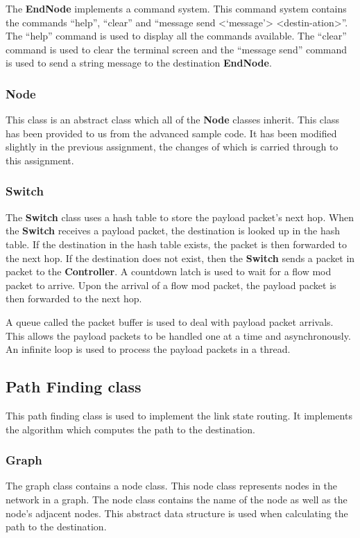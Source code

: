 \documentclass{article}
\begin{document}
The \textbf{EndNode} implements a command system. This command system contains
the commands ``help'', ``clear'' and ``message send
\textless`message'\textgreater
\textless{}destin-\newline{}ation\textgreater{}''. The ``help'' command is used
to display all the commands available. The ``clear'' command is used to clear the
terminal screen and the ``message send'' command is used to send a string
message to the destination \textbf{EndNode}.

\subsubsection{Node}
This class is an abstract class which all of the \textbf{Node} classes inherit.
This class has been provided to us from the advanced sample code. It has been
modified slightly in the previous assignment, the changes of which is carried
through to this assignment.

\subsubsection{Switch}
The \textbf{Switch} class uses a hash table to store the payload packet's next
hop. When the \textbf{Switch} receives a payload packet, the destination is
looked up in the hash table. If the destination in the hash table exists, the
packet is then forwarded to the next hop. If the destination does not exist,
then the \textbf{Switch} sends a packet in packet to the \textbf{Controller}.
A countdown latch is used to wait for a flow mod packet to arrive. Upon the
arrival of a flow mod packet, the payload packet is then forwarded to the
next hop.

A queue called the packet buffer is used to deal with payload packet arrivals.
This allows the payload packets to be handled one at a time and asynchronously.
An infinite loop is used to process the payload packets in a thread.

\subsection{Path Finding class}
This path finding class is used to implement the link state routing. It
implements the algorithm which computes the path to the destination.

\subsubsection{Graph}
The graph class contains a node class. This node class represents nodes in the
network in a graph. The node class contains the name of the node as well as the
node's adjacent nodes. This abstract data structure is used when calculating the
path to the destination.
\end{document}
